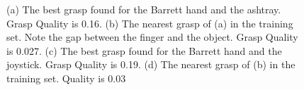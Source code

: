 \begin{figure}
  \centering

 \caption{  {(a) The best grasp found for the Barrett hand and the ashtray. Grasp Quality is 0.16. (b) The nearest grasp of (a) in the training set. Note the gap between the finger and the object. Grasp Quality is 0.027. (c) The best grasp found for the Barrett hand and the joystick. Grasp Quality is 0.19. (d) The nearest grasp of (b) in the training set. Quality is 0.03 }
}
    \label{near}
\end{figure}


